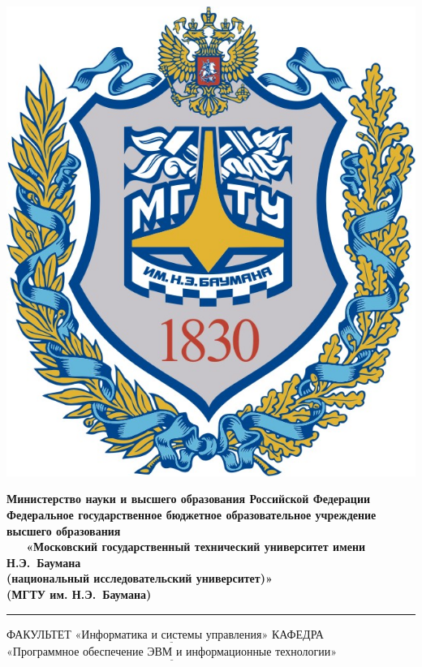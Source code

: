 \begin{titlepage}
	\noindent \begin{minipage}{0.15\textwidth}
	\includegraphics[width=\linewidth]{./inc/img/bmstu.png} 
	\end{minipage}
	\noindent\begin{minipage}{0.9\textwidth}\centering
		\textbf{Министерство науки и высшего образования Российской Федерации}\\
		\textbf{Федеральное государственное бюджетное образовательное учреждение высшего образования}\\
		\textbf{~~~«Московский государственный технический университет имени Н.Э.~Баумана}\\
		\textbf{(национальный исследовательский университет)»}\\
		\textbf{(МГТУ им. Н.Э.~Баумана)}
	\end{minipage}
	
	\noindent\rule{18cm}{3pt}
	\newline\newline
	\noindent ФАКУЛЬТЕТ $\underline{\text{«Информатика и системы управления»}}$ \newline\newline
	\noindent КАФЕДРА $\underline{\text{«Программное обеспечение ЭВМ и информационные технологии»}}$\newline\newline\newline\newline\newline
	

\end{titlepage}
